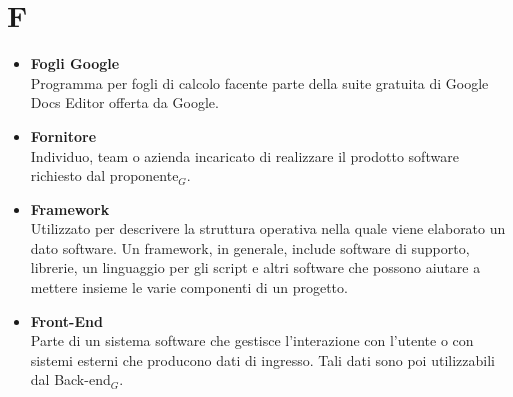 \chapter{F} \label{F}
\begin{itemize}	
	\item \textbf{Fogli Google}\\
	Programma per fogli di calcolo facente parte della suite gratuita di Google Docs Editor offerta da Google.
		
	\item \textbf{Fornitore}\\
	Individuo, team o azienda incaricato di realizzare  il prodotto software richiesto dal proponente$_G$.		
	
	\item \textbf{Framework} \\
	Utilizzato per descrivere la struttura operativa nella quale viene elaborato un dato software.
	Un framework, in generale, include software di supporto, librerie, un linguaggio per gli script e altri software che possono aiutare a mettere insieme le varie componenti di un progetto.
	
	\item \textbf{Front-End} \\
	Parte di un sistema software che gestisce l'interazione con l'utente o con sistemi esterni che producono dati di ingresso.
	Tali dati sono poi utilizzabili dal Back-end$_G$.


\end{itemize}